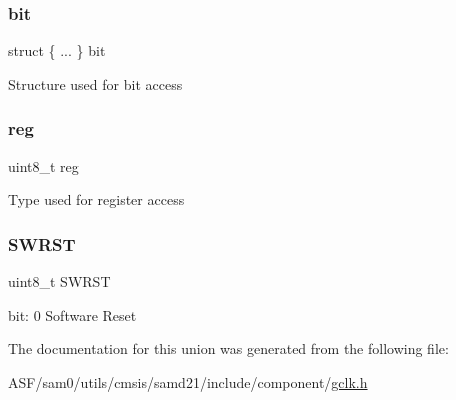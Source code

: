 \subsubsection{\texorpdfstring{bit}{bit}}
{\footnotesize\ttfamily struct \{ ... \}   bit}

Structure used for bit access \mbox{\label{union_g_c_l_k___c_t_r_l___type_a9428adc9af4653a2050e2536b55dec8d}} 
\subsubsection{\texorpdfstring{reg}{reg}}
{\footnotesize\ttfamily uint8\+\_\+t reg}

Type used for register access \mbox{\label{union_g_c_l_k___c_t_r_l___type_a9334d5ac0548802c90a8129c52c8e490}} 
\subsubsection{\texorpdfstring{SWRST}{SWRST}}
{\footnotesize\ttfamily uint8\+\_\+t S\+W\+R\+ST}

bit\+: 0 Software Reset 

The documentation for this union was generated from the following file\+:\begin{DoxyCompactItemize}
\item 
A\+S\+F/sam0/utils/cmsis/samd21/include/component/\mbox{\hyperlink{utils_2cmsis_2samd21_2include_2component_2gclk_8h}{gclk.\+h}}\end{DoxyCompactItemize}
